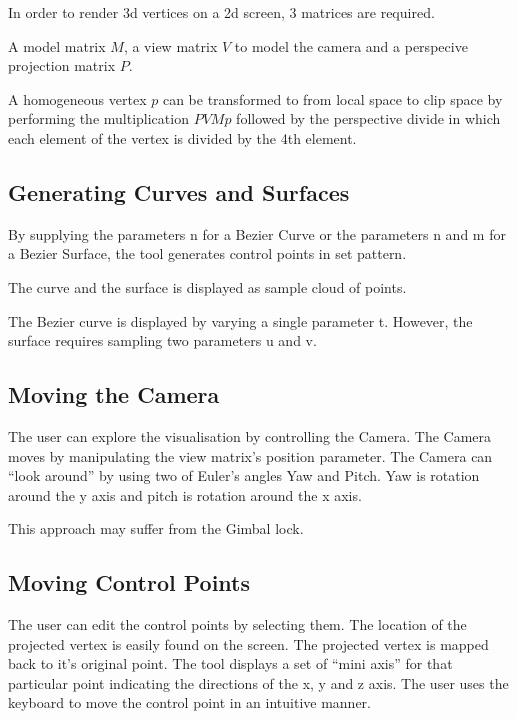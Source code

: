 \documentclass{article}
\begin{document}
In order to render 3d vertices on a 2d screen, 3 matrices are required.

A model matrix $M$, a view matrix $V$ to model the camera and a perspecive projection matrix $P$.

A homogeneous vertex $p$ can be transformed to from local space to clip space by performing the multiplication $PVMp$ followed by the perspective divide in which each element of the vertex is divided by the 4th element.

\subsection{Generating Curves and Surfaces}

By supplying the parameters n for a Bezier Curve or the parameters n and m for a Bezier Surface, the tool generates control points in set pattern. 

The curve and the surface is displayed as sample cloud of points.

The Bezier curve is displayed by varying a single parameter t. However, the surface requires sampling two parameters u and v. 


\subsection{Moving the Camera}

The user can explore the visualisation by controlling the Camera. The Camera moves by manipulating the view matrix's position parameter. The Camera can ``look around'' by using two of Euler's angles Yaw and Pitch. Yaw is rotation around the y axis and pitch is rotation around the x axis.

This approach may suffer from the Gimbal lock.


\subsection{Moving Control Points}

The user can edit the control points by selecting them. The location of the projected vertex is easily found on the screen. The projected vertex is mapped back to it's original point. The tool displays a set of ``mini axis'' for that particular point indicating the directions of the x, y and z axis. The user uses the keyboard to move the control point in an intuitive manner.
\end{document}
